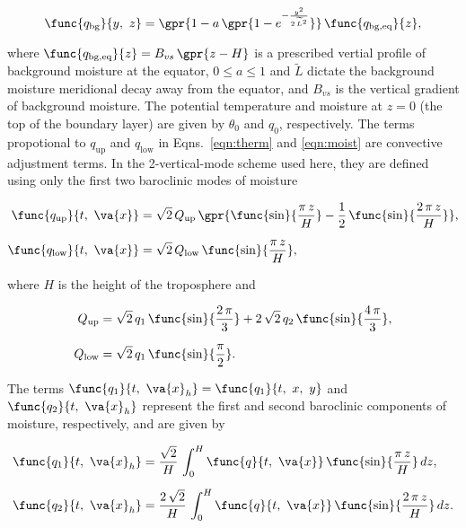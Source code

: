 \begin{equation}
	\func{q_{\text{bg}}}{y,\ z} = \gpr{1 - a\,\gpr{1 - e^{-\frac{y^2}{2\,\widetilde{L}^2}}}}\,\func{q_{\text{bg},\text{eq}}}{z},
\end{equation}

where $\func{q_{\text{bg},\text{eq}}}{z} = B_{vs}\,\gpr{z - H}$ is a prescribed vertial profile of background moisture at the equator, $0 \leq a \leq 1$ and $\widetilde{L}$ dictate the background moisture meridional decay away from the equator, and $B_{vs}$ is the vertical gradient of background moisture. The potential temperature and moisture at $z = 0$ (the top of the boundary layer) are given by $\theta_0$ and $q_0$, respectively. The terms propotional to $q_{\text{up}}$ and $q_{\text{low}}$ in Eqns.~\ref{eqn:therm} and \ref{eqn:moist} are convective adjustment terms. In the 2-vertical-mode scheme used here, they are defined using only the first two baroclinic modes of moisture

\begin{subequations}
	\begin{align}
		\func{q_{\text{up}}}{t,\ \va{x}} &= \sqrt{2}\,Q_{\text{up}}\,\gpr{\func{\sin}{\frac{\pi\,z}{H}} - \frac{1}{2}\,\func{\sin}{\frac{2\,\pi\,z}{H}}},\\[6pt]
		\func{q_{\text{low}}}{t,\ \va{x}} &= \sqrt{2}\,Q_{\text{low}}\,\func{\sin}{\frac{\pi\,z}{H}},
	\end{align}
\end{subequations}

where $H$ is the height of the troposphere and 

\begin{subequations}
	\begin{align}
		Q_{\text{up}} &= \sqrt{2}\,q_1\,\func{\sin}{\frac{2\,\pi}{3}} + 2\,\sqrt{2}\,q_2\,\func{\sin}{\frac{4\,\pi}{3}},\\[6pt]
		Q_{\text{low}} &= \sqrt{2}\,q_1\,\func{\sin}{\frac{\pi}{2}}.
	\end{align}
\end{subequations}

The terms $\func{q_1}{t,\ \va{x}_{h}} = \func{q_1}{t,\ x,\ y}$ and $\func{q_2}{t,\ \va{x}_h}$ represent the first and second baroclinic components of moisture, respectively, and are given by

\begin{subequations}
	\begin{align}
		\func{q_{1}}{t,\ \va{x}_{h}} &= \frac{\sqrt{2}}{H}\,\int_{0}^{H} \func{q}{t,\ \va{x}}\,\func{\sin}{\frac{\pi\,z}{H}}\,dz,\\[6pt]
		\func{q_{2}}{t,\ \va{x}_{h}} &= \frac{2\,\sqrt{2}}{H}\,\int_{0}^{H} \func{q}{t,\ \va{x}}\,\func{\sin}{\frac{2\,\pi\,z}{H}}\,dz.
	\end{align}
\end{subequations}

